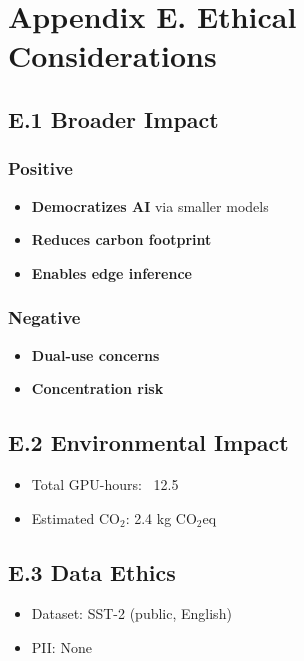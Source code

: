 
\section{Appendix E. Ethical Considerations}

\subsection{E.1 Broader Impact}

\subsubsection{Positive}
\begin{itemize}
\item \textbf{Democratizes AI} via smaller models
\item \textbf{Reduces carbon footprint}
\item \textbf{Enables edge inference}

\end{itemize}
\subsubsection{Negative}
\begin{itemize}
\item \textbf{Dual-use concerns}
\item \textbf{Concentration risk}

\end{itemize}
\subsection{E.2 Environmental Impact}

\begin{itemize}
\item Total GPU-hours: ~12.5
\item Estimated CO$_2$: 2.4 kg CO$_2$eq

\end{itemize}
\subsection{E.3 Data Ethics}

\begin{itemize}
\item Dataset: SST-2 (public, English)
\item PII: None

\end{itemize}
